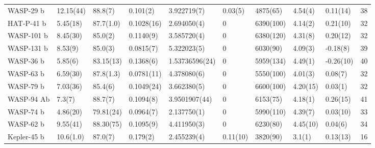 \begin{subappendices}
{\begin{landscape}
\begin{longtable}{llllllllll}
  WASP-29 b    &  12.15(44) &   88.8(7) &       0.101(2) &          3.922719(7) &       0.03(5) &   4875(65) &      4.54(4) &   0.11(14) &                                38   \\
  HAT-P-41 b    &   5.45(18) &   87.7(1.0) &     0.1028(16) &        2.694050(4) &       0 &         6390(100) &     4.14(2) &    0.21(10) &                                32\\
  WASP-101 b   &    8.45(30) &  85.0(2) &       0.1140(9) &         3.585720(4) &       0 &         6380(120) &     4.31(8) &    0.20(12) &                                32\\
  WASP-131 b   &   8.53(9) &    85.0(3) &       0.0815(7) &         5.322023(5) &       0 &         6030(90) &      4.09(3) &  -0.18(8) &                                39       \\
  WASP-36 b    &   5.85(6) &    83.15(13) &     0.1368(6) &         1.53736596(24) &    0 &         5959(134) &     4.49(1) &   -0.26(10) &                                40     \\
  WASP-63 b    &    6.59(30) &  87.8(1.3) &     0.0781(11) &        4.378080(6) &       0 &         5550(100) &     4.01(3) &   0.08(7) &                                32\\
  WASP-79 b    &   7.03(36) &   85.4(6) &       0.1049(24) &        3.662380(5) &       0 &         6600(100) &     4.20(15) &    0.03(1)&                                32\\
  WASP-94 Ab   &    7.3(7) &    88.7(7) &       0.1094(8) &         3.9501907(44) &     0 &         6153(75) &      4.18(1) &   0.26(15) &                          41          \\
  WASP-74 b    &    4.86(20) &  79.81(24) &     0.0964(7) &         2.137750(1) &       0 &         5990(110) &     4.39(7) &    0.03(10) &                                33 \\
  WASP-62 b    &   9.55(41) &   88.30(75) &     0.1095(9) &         4.411950(3) &       0 &         6230(80) &      4.45(10) &   0.04(6) &                                34 \\
  Kepler-45 b  &    10.6(1.0) & 87.0(7) &       0.179(2) &          2.455239(4) &       0.11(10) &  3820(90) &      3.1(1) &   0.13(13) &                                16      \\
  \hline
  \end{longtable}
\end{landscape}}
\end{subappendices}
